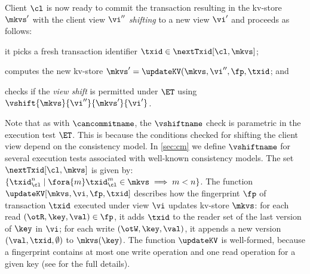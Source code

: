 Client \(\cl\) is  now ready to commit the transaction resulting 
in the kv-store \(\mkvs'\) with the client view \(\vi''\) \emph{shifting} to a new view \(\vi'\) and proceeds as follows: 
\begin{enumerate*}
	\item it picks a fresh transaction identifier \(\txid \in \nextTxid[\cl, \mkvs]\);
	\item computes the new kv-store \(\mkvs' = \updateKV(\mkvs, \vi'',\fp, \txid\); and 
	\item checks if the \emph{view shift} is permitted under \(\ET\) using \(\vshift{\mkvs}{\vi''}{\mkvs'}{\vi'}\). 
\end{enumerate*}
Note that as with \(\cancommitname\), the \(\vshiftname\) check is parametric in the execution test \(\ET\). 
This is because the conditions checked for shifting the client view depend on the consistency model. 
In \cref{sec:cm} we define \(\vshiftname\) for several execution tests associated with well-known consistency models.
The set \(\nextTxid[\cl, \mkvs]\) is given by:
\(
\{ \txid_{\cl}^{n} \mid %
\fora{m} \txid_{\cl}^{m} \in \mkvs \allowbreak \implies \allowbreak m < n \}
\).
The function \(\updateKV[\mkvs, \vi, \fp, \txid]\)
describes how the fingerprint \(\fp\) of transaction \(\txid\) executed under view \(\vi\) updates kv-store \(\mkvs\):
for each read \((\otR, \key, \val) \in \fp\), it adds \(\txid\) 
to the reader set of the last version of \(\key\) in \(\vi\); 
for each write \((\otW, \key, \val)\), it appends a new version \((\val, \txid, \emptyset)\) 
to \(\mkvs(\key)\). 
The function \( \updateKV \) is well-formed, because a fingerprint contains at most one write operation and one read operation for a given key (see \cite{shale-phd} for the full details).


